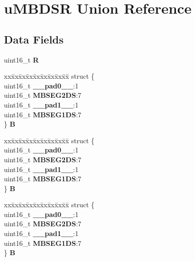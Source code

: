 \hypertarget{unionuMBDSR}{}\section{u\+M\+B\+D\+SR Union Reference}
\label{unionuMBDSR}
\subsection*{Data Fields}
\begin{DoxyCompactItemize}
\item 
\mbox{\label{unionuMBDSR_a34a4c5c82a1d234ab316bdaaee7930c1}} 
uint16\+\_\+t {\bfseries R}
\item 
\mbox{\label{unionuMBDSR_a6ea216ad203ef865af7e34840a3d120e}} 
\begin{tabbing}
xx\=xx\=xx\=xx\=xx\=xx\=xx\=xx\=xx\=\kill
struct \{\\
\>uint16\_t {\bfseries \_\_pad0\_\_}:1\\
\>uint16\_t {\bfseries MBSEG2DS}:7\\
\>uint16\_t {\bfseries \_\_pad1\_\_}:1\\
\>uint16\_t {\bfseries MBSEG1DS}:7\\
\} {\bfseries B}\\

\end{tabbing}\item 
\mbox{\label{unionuMBDSR_ab2fd253f5c9027001253f51a151e7842}} 
\begin{tabbing}
xx\=xx\=xx\=xx\=xx\=xx\=xx\=xx\=xx\=\kill
struct \{\\
\>uint16\_t {\bfseries \_\_pad0\_\_}:1\\
\>uint16\_t {\bfseries MBSEG2DS}:7\\
\>uint16\_t {\bfseries \_\_pad1\_\_}:1\\
\>uint16\_t {\bfseries MBSEG1DS}:7\\
\} {\bfseries B}\\

\end{tabbing}\item 
\mbox{\label{unionuMBDSR_a2139233b51b7d400241abe289ef85d22}} 
\begin{tabbing}
xx\=xx\=xx\=xx\=xx\=xx\=xx\=xx\=xx\=\kill
struct \{\\
\>uint16\_t {\bfseries \_\_pad0\_\_}:1\\
\>uint16\_t {\bfseries MBSEG2DS}:7\\
\>uint16\_t {\bfseries \_\_pad1\_\_}:1\\
\>uint16\_t {\bfseries MBSEG1DS}:7\\
\} {\bfseries B}\\


\end{tabbing}
\end{DoxyCompactItemize}
